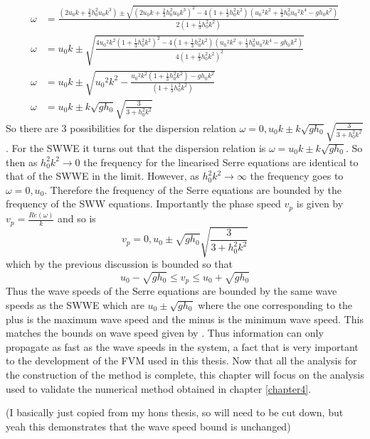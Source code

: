 \documentclass[12pt]{article}
\begin{document}
\begin{align*}
\omega &= \frac{\left(2{u_0}k + \frac{2}{3}h_0^2{u_0}k^3\right) \pm \sqrt{\left(2{u_0}k + \frac{2}{3}h_0^2{u_0}k^3\right)^2 - 4\left(1 + \frac{1}{3}h_0^2k^2\right)\left({u_0}^2k^2 +\frac{1}{3}h_0^2{u_0}^2k^4 - gh_0k^2\right)}}{2\left(1 + \frac{1}{3}h_0^2k^2\right)} \\
\omega &= {u_0}k \pm \sqrt{\frac{ 4{u_0}^2k^2 \left(1 + \frac{1}{3}h_0^2k^2\right)^2 - 4\left(1 + \frac{1}{3}h_0^2k^2\right)\left({u_0}^2k^2 + \frac{1}{3}h_0^2{u_0}^2k^4 - gh_0k^2\right)}{4\left(1 + \frac{1}{3}h_0^2k^2\right)^2}} \\
\omega &= {u_0}k \pm \sqrt{{u_0}^2k^2 - \frac{ {u_0}^2k^2\left(1 + \frac{1}{3}h_0^2k^2\right) - gh_0k^2}{\left(1 + \frac{1}{3}h_0^2k^2\right)}} \\
\omega &= {u_0}k \pm k\sqrt{gh_0}\sqrt{\frac{3}{3 + h_0^2k^2}}
\end{align*}
%
So there are 3 possibilities for the dispersion relation $\omega = 0,{u_0}k \pm k\sqrt{gh_0}\sqrt{\frac{3}{3 + h_0^2k^2}} $. For the SWWE it turns out that the dispersion relation is $\omega = {u_0}k \pm k\sqrt{gh_0}$. So then as $h_0^2k^2 \rightarrow 0 $ the frequency for the linearised Serre equations are identical to that of the SWWE in the limit. However, as $h_0^2k^2 \rightarrow \infty $ the frequency goes to $\omega = 0,{u_0}$. Therefore the frequency of the Serre equations are bounded by the frequency of the SWW equations. Importantly the phase speed $v_p$ is given by $v_p = \frac{Re(\omega)}{k}$ and so is
%
\[v_p = 0, {u_0} \pm \sqrt{gh_0}\sqrt{\frac{3}{3 + h_0^2k^2}} \] 
%
which by the previous discussion is bounded so that
%
\[ {u_0} -  \sqrt{gh_0} \le v_p \le {u_0} +  \sqrt{gh_0}\]
%
Thus the wave speeds of the Serre equations are bounded by the same wave speeds as the SWWE which are ${u_0} \pm \sqrt{gh_0}$ where the one corresponding to the plus is the maximum wave speed and the minus is the minimum wave speed. This matches the bounds on wave speed given by \cite{LeMetayer2010}. Thus information can only propagate as fast as the wave speeds in the system, a fact that is very important to the development of the FVM used in this thesis. Now that all the analysis for the construction of the method is complete, this chapter will focus on the analysis used to validate the numerical method obtained in chapter \ref{chapter4}.

(I basically just copied from my hons thesis, so will need to be cut down, but yeah this demonstrates that the wave speed bound is unchanged)
\end{document}
